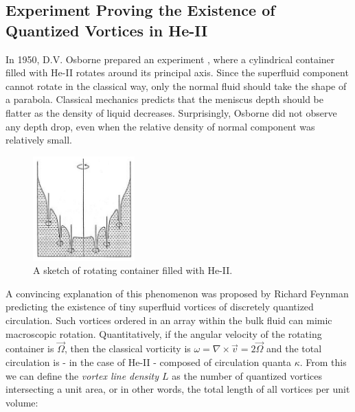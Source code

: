 \newpage




\subsection*{Experiment Proving the Existence of Quantized Vortices in He-II}

In 1950, D.V. Osborne prepared an experiment \cite{osborne}, where a cylindrical container filled with He-II rotates around its principal axis. Since the superfluid component cannot rotate in the classical way, only the normal fluid should take the shape of a parabola. Classical mechanics predicts that the meniscus depth should be flatter as the density of liquid decreases. Surprisingly, Osborne did not observe any depth drop, even when the relative density of normal component was relatively small. 

\begin{figure}
\vspace{-0.7cm}
\centering
\includegraphics[width=0.35\textwidth]{graphics/rot_cont}
\vspace{-0.5cm}
\caption{A sketch of rotating container filled with He-II.}
\vspace{-0.5cm}
\end{figure}

A convincing explanation of this phenomenon was proposed by Richard Feynman\cite{feynman} predicting the existence of tiny superfluid vortices of discretely quantized circulation.
Such vortices ordered in an array within the bulk fluid can mimic macroscopic rotation. Quantitatively, if the angular velocity of the rotating container is $\vec{\Omega}$, then the classical vorticity is $ \omega = \nabla \times \vec{v} = 2\vec{\Omega} $ and the total circulation is - in the case of He-II - composed of circulation quanta $ \kappa $. From this we can define the \textit{vortex line density $ L $} as the number of quantized vortices intersecting a unit area, or in other words, the total length of all vortices per unit volume:

